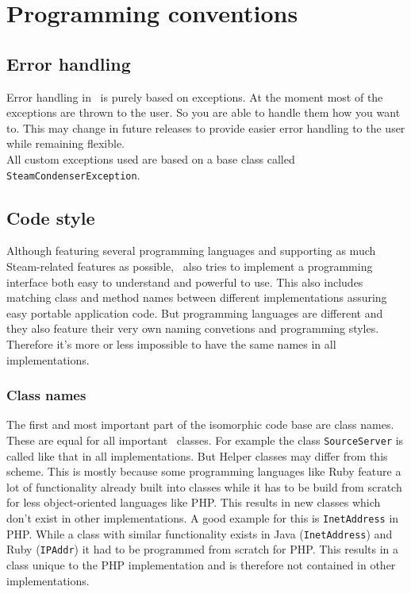 \chapter{Programming conventions}

\section{Error handling}
Error handling in \steamcondenser\ is purely based on exceptions. At the moment
most of the exceptions are thrown to the user. So you are able to handle them
how you want to. This may change in future releases to provide easier error
handling to the user while remaining flexible.\\
All custom exceptions used are based on a base class called
\lstinline{SteamCondenserException}.

\section{Code style}
Although featuring several programming languages and supporting as much
Steam-related features as possible, \steamcondenser\ also tries to implement a
programming interface both easy to understand and powerful to use. This also
includes matching class and method names between different implementations
assuring easy portable application code. But programming languages are different
and they also feature their very own naming convetions and programming styles.
Therefore it's more or less impossible to have the same names in all
implementations.

\subsection{Class names}
The first and most important part of the isomorphic code base are class names.
These are equal for all important \steamcondenser\ classes. For example the
class \lstinline{SourceServer} is called like that in all implementations. But
Helper classes may differ from this scheme. This is mostly because some
programming languages like Ruby feature a lot of functionality already built
into classes while it has to be build from scratch for less object-oriented
languages like PHP. This results in new classes which don't exist in other
implementations. A good example for this is \lstinline{InetAddress} in PHP.
While a class with similar functionality exists in Java
(\lstinline{InetAddress}) and Ruby (\lstinline{IPAddr}) it had to be
programmed from scratch for PHP. This results in a class unique to the PHP
implementation and is therefore not contained in other implementations.

